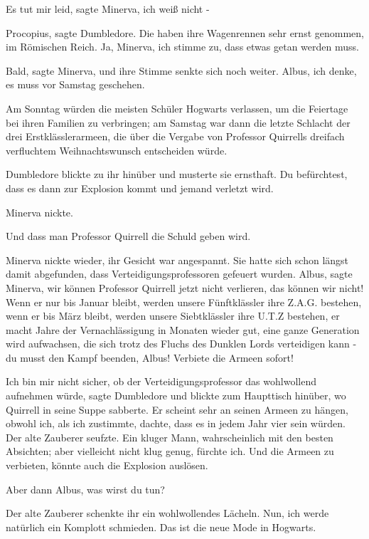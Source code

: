 \glqq{}Es tut mir leid\grqq{}, sagte Minerva, \glqq{}ich weiß nicht -\grqq{}

\glqq{}Procopius\grqq{}, sagte Dumbledore. \glqq{}Die haben ihre Wagenrennen sehr
ernst genommen, im Römischen Reich. Ja, Minerva, ich stimme zu, dass etwas getan
werden muss.\grqq{}

\glqq{}Bald\grqq{}, sagte Minerva, und ihre Stimme senkte sich noch weiter. \glqq{}
Albus, ich denke, es muss vor Samstag geschehen.\grqq{}

Am Sonntag würden die meisten Schüler Hogwarts verlassen, um die Feiertage bei
ihren Familien zu verbringen; am Samstag war dann die letzte Schlacht der drei
Erstklässlerarmeen, die über die Vergabe von Professor Quirrells dreifach
verfluchtem Weihnachtswunsch entscheiden würde.

Dumbledore blickte zu ihr hinüber und musterte sie ernsthaft. \glqq{}Du
befürchtest, dass es dann zur Explosion kommt und jemand verletzt wird.\grqq{}

Minerva nickte.

\glqq{}Und dass man Professor Quirrell die Schuld geben wird.\grqq{}

Minerva nickte wieder, ihr Gesicht war angespannt. Sie hatte sich schon längst
damit abgefunden, dass Verteidigungsprofessoren gefeuert wurden. \glqq{}
Albus\grqq{}, sagte Minerva, \glqq{}wir können Professor Quirrell jetzt nicht
verlieren, das können wir nicht! Wenn er nur bis Januar bleibt, werden unsere
Fünftklässler ihre Z.A.G. bestehen, wenn er bis März bleibt, werden unsere
Siebtklässler ihre U.T.Z bestehen, er macht Jahre der Vernachlässigung in
Monaten wieder gut, eine ganze Generation wird aufwachsen, die sich trotz des
Fluchs des Dunklen Lords verteidigen kann - du musst den Kampf beenden, Albus!
Verbiete die Armeen sofort!\grqq{}

\glqq{}Ich bin mir nicht sicher, ob der Verteidigungsprofessor das wohlwollend
aufnehmen würde\grqq{}, sagte Dumbledore und blickte zum Haupttisch hinüber, wo
Quirrell in seine Suppe sabberte. \glqq{}Er scheint sehr an seinen Armeen zu
hängen, obwohl ich, als ich zustimmte, dachte, dass es in jedem Jahr vier sein
würden.\grqq{} Der alte Zauberer seufzte. \glqq{}Ein kluger Mann, wahrscheinlich mit
den besten Absichten; aber vielleicht nicht klug genug, fürchte ich. Und die
Armeen zu verbieten, könnte auch die Explosion auslösen.\grqq{}

\glqq{}Aber dann Albus, was wirst du tun?\grqq{}

Der alte Zauberer schenkte ihr ein wohlwollendes Lächeln. \glqq{}Nun, ich werde
natürlich ein Komplott schmieden. Das ist die neue Mode in Hogwarts.\grqq{}

